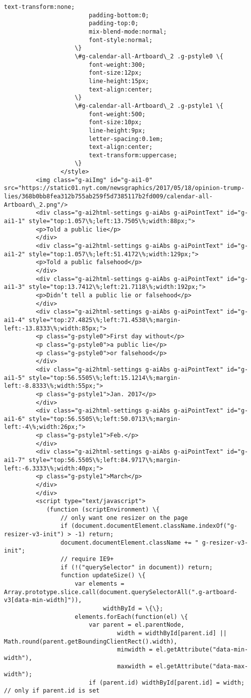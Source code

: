 \documentclass[11pt]{article}
\begin{document}
\begin{Verbatim}[commandchars=\\\{\}]
         				text-transform:none;
         				padding-bottom:0;
         				padding-top:0;
         				mix-blend-mode:normal;
         				font-style:normal;
         			\}
         			\#g-calendar-all-Artboard\_2 .g-pstyle0 \{
         				font-weight:300;
         				font-size:12px;
         				line-height:15px;
         				text-align:center;
         			\}
         			\#g-calendar-all-Artboard\_2 .g-pstyle1 \{
         				font-weight:500;
         				font-size:10px;
         				line-height:9px;
         				letter-spacing:0.1em;
         				text-align:center;
         				text-transform:uppercase;
         			\}
         		</style>
         <img class="g-aiImg" id="g-ai1-0" src="https://static01.nyt.com/newsgraphics/2017/05/18/opinion-trump-lies/368b0bb8fea312b755ab259f5d7385117b2fd009/calendar-all-Artboard\_2.png"/>
         <div class="g-ai2html-settings g-aiAbs g-aiPointText" id="g-ai1-1" style="top:1.057\%;left:13.7505\%;width:88px;">
         <p>Told a public lie</p>
         </div>
         <div class="g-ai2html-settings g-aiAbs g-aiPointText" id="g-ai1-2" style="top:1.057\%;left:51.4172\%;width:129px;">
         <p>Told a public falsehood</p>
         </div>
         <div class="g-ai2html-settings g-aiAbs g-aiPointText" id="g-ai1-3" style="top:13.7412\%;left:21.7118\%;width:192px;">
         <p>Didn’t tell a public lie or falsehood</p>
         </div>
         <div class="g-ai2html-settings g-aiAbs g-aiPointText" id="g-ai1-4" style="top:27.4825\%;left:71.4538\%;margin-left:-13.8333\%;width:85px;">
         <p class="g-pstyle0">First day without</p>
         <p class="g-pstyle0">a public lie</p>
         <p class="g-pstyle0">or falsehood</p>
         </div>
         <div class="g-ai2html-settings g-aiAbs g-aiPointText" id="g-ai1-5" style="top:56.5505\%;left:15.1214\%;margin-left:-8.8333\%;width:55px;">
         <p class="g-pstyle1">Jan. 2017</p>
         </div>
         <div class="g-ai2html-settings g-aiAbs g-aiPointText" id="g-ai1-6" style="top:56.5505\%;left:50.0713\%;margin-left:-4\%;width:26px;">
         <p class="g-pstyle1">Feb.</p>
         </div>
         <div class="g-ai2html-settings g-aiAbs g-aiPointText" id="g-ai1-7" style="top:56.5505\%;left:84.9717\%;margin-left:-6.3333\%;width:40px;">
         <p class="g-pstyle1">March</p>
         </div>
         </div>
         <script type="text/javascript">
         	(function (scriptEnvironment) \{
         		// only want one resizer on the page
         		if (document.documentElement.className.indexOf("g-resizer-v3-init") > -1) return;
         		document.documentElement.className += " g-resizer-v3-init";
         		// require IE9+
         		if (!("querySelector" in document)) return;
         		function updateSize() \{
         			var elements = Array.prototype.slice.call(document.querySelectorAll(".g-artboard-v3[data-min-width]")),
         					widthById = \{\};
         			elements.forEach(function(el) \{
         				var parent = el.parentNode,
         						width = widthById[parent.id] || Math.round(parent.getBoundingClientRect().width),
         						minwidth = el.getAttribute("data-min-width"),
         						maxwidth = el.getAttribute("data-max-width");
         				if (parent.id) widthById[parent.id] = width; // only if parent.id is set
         

\end{Verbatim}
\end{document}
